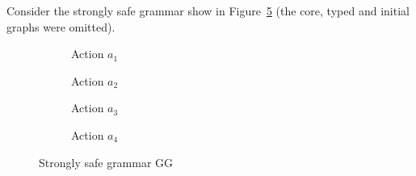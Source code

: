 \begin{example} Consider the strongly safe grammar show in Figure~\ref{fig:process:order} (the core, typed and initial graphs were omitted). 
  
\begin{figure}[!ht]
  \centering
  \begin{subfigure}[t]{.2\textwidth}
    \centerline{}
    \caption{Action $a_1$}\label{fig:process:order:a1}
  \end{subfigure}%
  \begin{subfigure}[t]{.2\textwidth}
    \centerline{}
    \caption{Action $a_2$}\label{fig:process:order:a2}
  \end{subfigure}%
  \begin{subfigure}[t]{.3\textwidth}
    \centerline{}
    \caption{Action $a_3$}\label{fig:process:order:a3}
  \end{subfigure}%
  \begin{subfigure}[t]{.2\textwidth}
    \centerline{}
    \caption{Action $a_4$}\label{fig:process:order:a4}
  \end{subfigure}
  \caption{Strongly safe grammar GG}\label{fig:process:order}
\end{figure}


\end{example}
